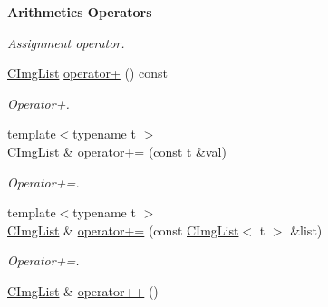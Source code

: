 \begin{Indent}{\bf Arithmetics Operators}
\begin{DoxyCompactItemize}
\begin{DoxyCompactList}\small\item\em Assignment operator. \end{DoxyCompactList}\item 
\hypertarget{structcimg__library_1_1_c_img_list_a700e85091aeb1e05a27dbbb3be76d7ea}{\hyperlink{structcimg__library_1_1_c_img_list}{C\-Img\-List} \hyperlink{structcimg__library_1_1_c_img_list_a700e85091aeb1e05a27dbbb3be76d7ea}{operator+} () const }\label{structcimg__library_1_1_c_img_list_a700e85091aeb1e05a27dbbb3be76d7ea}

\begin{DoxyCompactList}\small\item\em Operator+. \end{DoxyCompactList}\item 
\hypertarget{structcimg__library_1_1_c_img_list_abeac06b94e607e0be4db24398b101cc8}{{\footnotesize template$<$typename t $>$ }\\\hyperlink{structcimg__library_1_1_c_img_list}{C\-Img\-List} \& \hyperlink{structcimg__library_1_1_c_img_list_abeac06b94e607e0be4db24398b101cc8}{operator+=} (const t \&val)}\label{structcimg__library_1_1_c_img_list_abeac06b94e607e0be4db24398b101cc8}

\begin{DoxyCompactList}\small\item\em Operator+=. \end{DoxyCompactList}\item 
\hypertarget{structcimg__library_1_1_c_img_list_a8040b13e20b3f6d64c2acdbd83504907}{{\footnotesize template$<$typename t $>$ }\\\hyperlink{structcimg__library_1_1_c_img_list}{C\-Img\-List} \& \hyperlink{structcimg__library_1_1_c_img_list_a8040b13e20b3f6d64c2acdbd83504907}{operator+=} (const \hyperlink{structcimg__library_1_1_c_img_list}{C\-Img\-List}$<$ t $>$ \&list)}\label{structcimg__library_1_1_c_img_list_a8040b13e20b3f6d64c2acdbd83504907}

\begin{DoxyCompactList}\small\item\em Operator+=. \end{DoxyCompactList}\item 
\hypertarget{structcimg__library_1_1_c_img_list_a5313d2aede4ed008786a9acfefa241c5}{\hyperlink{structcimg__library_1_1_c_img_list}{C\-Img\-List} \& \hyperlink{structcimg__library_1_1_c_img_list_a5313d2aede4ed008786a9acfefa241c5}{operator++} ()}\label{structcimg__library_1_1_c_img_list_a5313d2aede4ed008786a9acfefa241c5}


\end{DoxyCompactItemize}
\end{Indent}
